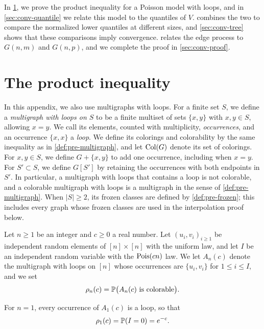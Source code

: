 In \cref{sec:conv-interp}, we prove the product inequality for a Poisson model with loops, and in \cref{sec:conv-quantile} we relate this model to the quantiles of $V$.  combines the two to compare the normalized lower quantiles at different sizes, and \cref{sec:conv-tree} shows that these comparisons imply convergence.  relates the edge process to $G(n, m)$ and $G(n, p)$, and we complete the proof in \cref{sec:conv-proof}.

\section{The product inequality}\label{sec:conv-interp}

In this appendix, we also use multigraphs with loops. For a finite set $S$, we define a \emph{multigraph with loops on $S$} to be a finite multiset of sets $\{x, y\}$ with $x, y \in S$, allowing $x = y$. We call its elements, counted with multiplicity, \emph{occurrences}, and an occurrence $\{x, x\}$ a \emph{loop}. We define its colorings and colorability by the same inequality as in \cref{def:pre-multigraph}, and let $\operatorname{Col}(G)$ denote its set of colorings. For $x, y \in S$, we define $G + \{x, y\}$ to add one occurrence, including when $x = y$. For $S' \subset S$, we define $G[S']$ by retaining the occurrences with both endpoints in $S'$. In particular, a multigraph with loops that contains a loop is not colorable, and a colorable multigraph with loops is a multigraph in the sense of \cref{def:pre-multigraph}. When $|S| \ge 2$, its frozen classes are defined by \cref{def:pre-frozen}; this includes every graph whose frozen classes are used in the interpolation proof below.

\begin{definition}\label{def:conv-poisson}
Let $n \ge 1$ be an integer and $c \ge 0$ a real number. Let $(u_i, v_i)_{i \ge 1}$ be independent random elements of $[n] \times [n]$ with the uniform law, and let $I$ be an independent random variable with the $\operatorname{Pois}(cn)$ law. We let $A_n(c)$ denote the multigraph with loops on $[n]$ whose occurrences are $\{u_i, v_i\}$ for $1 \le i \le I$, and we set
\begin{equation}\label{eq:conv-rho}
\rho_n(c) = \mathbb P\big(A_n(c) \text{ is colorable}\big).
\end{equation}
\end{definition}

For $n = 1$, every occurrence of $A_1(c)$ is a loop, so that
\begin{equation}\label{eq:conv-rho1}
\rho_1(c) = \mathbb P(I = 0) = e^{-c}.
\end{equation}

